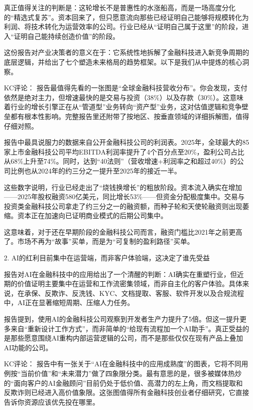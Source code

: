 \documentclass[11pt]{ctexart}
\begin{document}
真正值得关注的判断是：这轮增长不是普惠性的水涨船高，而是一场高度分化的“精选式复苏”。资本回来了，但只愿意流向那些已经证明自己能够将规模转化为利润、将技术转化为运营效率的公司。行业已经从“证明自己属于这里”的阶段，进入“证明自己能持续创造价值”的阶段。

这份报告对产业决策者的意义在于：它系统性地拆解了金融科技进入新竞争周期的底层逻辑，并给出了七个塑造未来格局的趋势框架。以下是我们从中提炼的核心洞察。

KC评论： 报告最值得先看的一张图是“全球金融科技营收分布”。你会发现，支付依然是绝对主力，但增速最快的是交易与投资（38\%）以及存款（30\%）。这意味着行业的增长引擎正在从“管道型”业务转向“资产型”业务，这对估值逻辑和竞争壁垒都有根本性影响。完整报告里还附带了按地区、按垂直领域的详细拆解图，值得仔细对照。

报告中最具说服力的数据来自公开金融科技公司的利润表。2025年，全球最大的85家上市金融科技公司平均EBITDA利润率提升了4个百分点至20\%，盈利公司占比从68\%上升至74\%。同时，达到“40法则”（营收增速+利润率之和超过40\%）的公司比例也从2024年的约三分之一提升至2025年的接近一半。

这些数字说明，行业已经走出了“烧钱换增长”的粗放阶段。资本流入确实在增加——2025年股权融资580亿美元，同比增长53\%——但资金分配极度集中。交易与投资类金融科技公司拿走了约三分之一的融资额，而种子轮和天使轮融资则出现萎缩。资本正在加速向已证明商业模式的后期公司集中。

这意味着，对于还在早期阶段的金融科技公司而言，融资门槛比2021年之前更高了。市场不再为“故事”买单，而是为“可复制的盈利路径”买单。

2. AI的红利目前集中在运营端，而非客户体验端，这决定了谁先受益

报告对AI在金融科技中的应用给出了一个清醒的判断：AI确实在重塑行业，但近期的价值证明主要集中在运营和工作流密集领域，而非自主化的客户体验。具体来说，在承保、反欺诈、反洗钱、KYC、文档提取、客服、软件开发以及合规流程中，AI正在显著缩短周期、压缩人力任务。

报告提到，使用AI的金融科技公司观察到开发者生产力提升了5倍。但这一提升更多来自“重新设计工作方式”，而非简单的“给现有流程加一个AI助手”。真正受益的是那些愿意围绕AI重构内部运营逻辑的公司，而不是那些仅仅在现有产品上叠加AI功能的公司。

KC评论： 报告中有一张关于“AI在金融科技中的应用成熟度”的图表，它将不同用例按“当前价值”和“未来潜力”做了四象限分类。最有意思的是，很多被媒体热炒的“面向客户的AI金融顾问”目前仍处于低价值、高潜力的左上角，而文档提取和反欺诈则已经进入高价值象限。这张图值得所有金融科技创业者仔细研究，它直接告诉你资源应该优先投在哪里。
\end{document}
